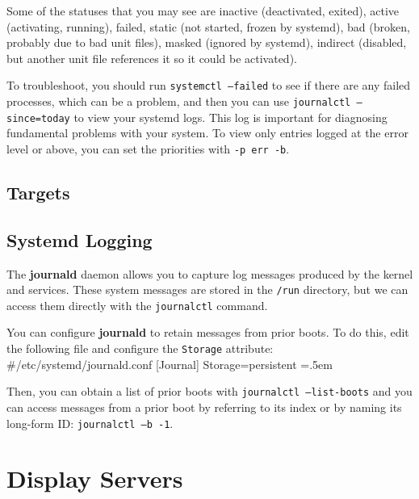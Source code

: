 \documentclass{article}
\newenvironment{cverbatim}
    {\SaveVerbatim{cverb}}
    {\endSaveVerbatim
    \flushleft\fboxrule=0pt\fboxsep=.5em
    \colorbox{cverbbg}{%
      \makebox[\dimexpr\linewidth-2\fboxsep][l]{\BUseVerbatim{cverb}}%
    }
    \endflushleft
  }
\begin{document}
    Some of the statuses that you may see are inactive (deactivated, exited), active (activating, running), failed, static (not started, frozen by systemd), bad (broken, probably due to bad unit files), masked (ignored by systemd), indirect (disabled, but another unit file references it so it could be activated). 

    To troubleshoot, you should run \texttt{systemctl --failed} to see if there are any failed processes, which can be a problem, and then you can use \texttt{journalctl --since=today} to view your systemd logs. This log is important for diagnosing fundamental problems with your system. To view only entries logged at the error level or above, you can set the priorities with \texttt{-p err -b}. 

  \subsection{Targets}

    
  \subsection{Systemd Logging}

    The \textbf{journald} daemon allows you to capture log messages produced by the kernel and services. These system messages are stored in the \texttt{/run} directory, but we can access them directly with the \texttt{journalctl}  command. 

    \begin{example}
      
    \end{example}

    You can configure \textbf{journald} to retain messages from prior boots. To do this, edit the following file and configure the \texttt{Storage} attribute: 
    \begin{cverbatim}
    #/etc/systemd/journald.conf
      [Journal]
      Storage=persistent
    \end{cverbatim}

    Then, you can obtain a list of prior boots with \texttt{journalctl --list-boots} and you can access messages from a prior boot by referring to its index or by naming its long-form ID: \texttt{journalctl --b -1}. 

\section{Display Servers}
\end{document}
